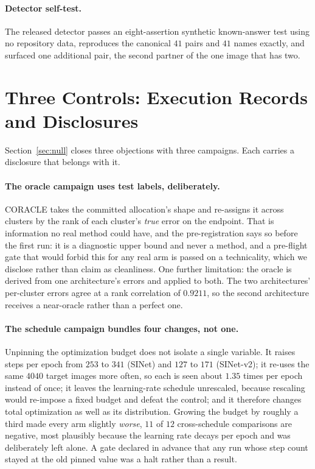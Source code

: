 \documentclass{article}
\begin{document}
\paragraph{Detector self-test.} The released detector passes an eight-assertion synthetic
known-answer test using no repository data, reproduces the canonical $41$ pairs and $41$ names exactly, and surfaced one additional pair, the second partner of the one image that has two.

\section{Three Controls: Execution Records and Disclosures}
\label{app:controls}

Section~\ref{sec:null} closes three objections with three campaigns. Each carries a disclosure that
belongs with it.

\paragraph{The oracle campaign uses test labels, deliberately.} CORACLE takes the committed
allocation's shape and re-assigns it across clusters by the rank of each cluster's \emph{true} error
on the endpoint. That is information no real method could have, and the pre-registration says so
before the first run: it is a diagnostic upper bound and never a method, and a pre-flight gate that
would forbid this for any real arm is passed on a technicality, which we disclose rather than claim
as cleanliness. One further limitation: the oracle is derived from one architecture's errors and
applied to both. The two architectures' per-cluster errors agree at a rank correlation of $0.9211$,
so the second architecture receives a near-oracle rather than a perfect one.

\paragraph{The schedule campaign bundles four changes, not one.} Unpinning the optimization budget
does not isolate a single variable. It raises steps per epoch from $253$ to $341$ (SINet) and $127$
to $171$ (SINet-v2); it re-uses the same $4040$ target images more often, so each is seen about
$1.35$ times per epoch instead of once; it leaves the learning-rate schedule unrescaled, because
rescaling would re-impose a fixed budget and defeat the control; and it therefore changes total
optimization as well as its distribution. Growing the budget by roughly a third made every arm
slightly \emph{worse}, $11$ of $12$ cross-schedule comparisons are negative, most plausibly
because the learning rate decays per epoch and was deliberately left alone. A gate declared in
advance that any run whose step count stayed at the old pinned value was a halt rather than a
result.
\end{document}
